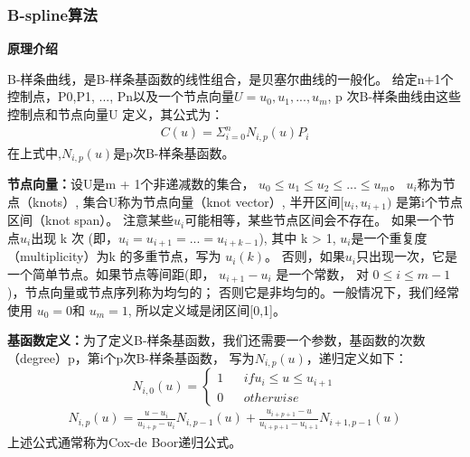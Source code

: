 \documentclass[a4paper,UTF8]{article}
\theoremstyle{definition}
\begin{document}

\subsubsection{B-spline算法}
\textbf{原理介绍}\par
B-样条曲线，是B-样条基函数的线性组合，是贝塞尔曲线的一般化。
给定n+1个控制点，P0,P1, ..., Pn以及一个节点向量$U={u_0,u_1, ...,u_m}$, p 次B-样条曲线由这些控制点和节点向量U 定义，其公式为：
\begin{align}
C(u)=\Sigma_{i=0}^nN_{i,p}(u)P_i
\end{align}
在上式中,$N_{i,p}(u)$是p次B-样条基函数。

\textbf{节点向量：}设U是m + 1个非递减数的集合，
$u_0\leq u_1\leq u_2\leq...\leq u_m$。
$u_i$称为节点（knots）, 集合U称为节点向量（knot vector）,
半开区间$[u_i, u_{i+1})$ 是第i个节点区间（knot span）。
注意某些$u_i$可能相等，某些节点区间会不存在。
如果一个节点$u_i$出现 k 次 (即，$u_i=u_{i+1}=...=u_{i+k-1}$),
其中 k > 1, $u_i$是一个重复度（multiplicity）为k 的多重节点，写为 $u_i(k)$。
否则，如果$u_i$只出现一次，它是一个简单节点。如果节点等间距(即， $u_{i+1}-u_i$ 是一个常数，
对 $0\leq i\leq m-1$)，节点向量或节点序列称为均匀的；
否则它是非均匀的。一般情况下，我们经常使用 $u_0=0$和 $u_m=1$,
所以定义域是闭区间[0,1]。

\textbf{基函数定义：}为了定义B-样条基函数，我们还需要一个参数，基函数的次数（degree）p，第i个p次B-样条基函数，
写为$N_{i,p}(u)$，递归定义如下：
$$ N_{i,0}(u)=\left\{
\begin{array}{rcl}
1       &      & {if u_i\leq u\leq u_{i+1}}\\
0     &      & {otherwise}
\end{array} \right. $$
\begin{align}
N_{i,p}(u)=\frac{u-u_i}{u_{i+p}-u_i}N_{i,p-1}(u)+\frac{u_{i+p+1}-u}{u_{i+p+1}-u_{i+1}}N_{i+1,p-1}(u)
\end{align}
上述公式通常称为Cox-de Boor递归公式。\cite{B-spline}
\end{document}
